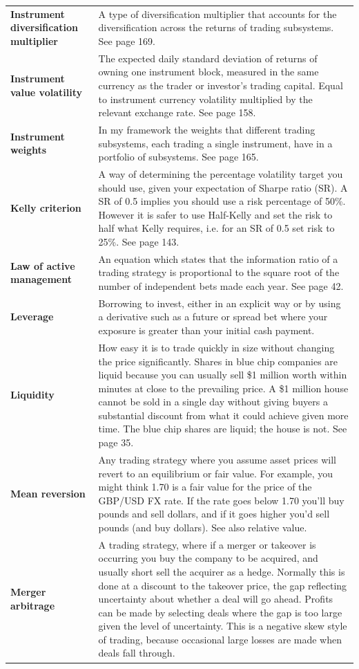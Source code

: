 {\begin{longtable}{@{}>{\raggedright\arraybackslash\bfseries} p{}>{\raggedright\arraybackslash} p{}@{}}
Instrument diversification multiplier & A type of diversification multiplier that accounts for the diversification across the returns of trading subsystems. See page 169. \\[0.65em]
Instrument value volatility & The expected daily standard deviation of returns of owning one instrument block, measured in the same currency as the trader or investor’s trading capital. Equal to instrument currency volatility multiplied by the relevant exchange rate. See page 158. \\[0.65em]
Instrument weights & In my framework the weights that different trading subsystems, each trading a single instrument, have in a portfolio of subsystems. See page 165. \\[0.65em]
Kelly criterion & A way of determining the percentage volatility target you should use, given your expectation of Sharpe ratio (SR). A SR of 0.5 implies you should use a risk percentage of 50\%. However it is safer to use Half-Kelly and set the risk to half what Kelly requires, i.e. for an SR of 0.5 set risk to 25\%. See page 143. \\[0.65em]
Law of active management & An equation which states that the information ratio of a trading strategy is proportional to the square root of the number of independent bets made each year. See page 42. \\[0.65em]
Leverage & Borrowing to invest, either in an explicit way or by using a derivative such as a future or spread bet where your exposure is greater than your initial cash payment. \\[0.65em]
Liquidity & How easy it is to trade quickly in size without changing the price significantly. Shares in blue chip companies are liquid because you can usually sell \$1 million worth within minutes at close to the prevailing price. A \$1 million house cannot be sold in a single day without giving buyers a substantial discount from what it could achieve given more time. The blue chip shares are liquid; the house is not. See page 35. \\[0.65em]
Mean reversion & Any trading strategy where you assume asset prices will revert to an equilibrium or fair value. For example, you might think 1.70 is a fair value for the price of the GBP/USD FX rate. If the rate goes below 1.70 you’ll buy pounds and sell dollars, and if it goes higher you’d sell pounds (and buy dollars). See also relative value. \\[0.65em]
Merger arbitrage & A trading strategy, where if a merger or takeover is occurring you buy the company to be acquired, and usually short sell the acquirer as a hedge. Normally this is done at a discount to the takeover price, the gap reflecting uncertainty about whether a deal will go ahead. Profits can be made by selecting deals where the gap is too large given the level of uncertainty. This is a negative skew style of trading, because occasional large losses are made when deals fall through. \\[0.65em]

\end{longtable}}
